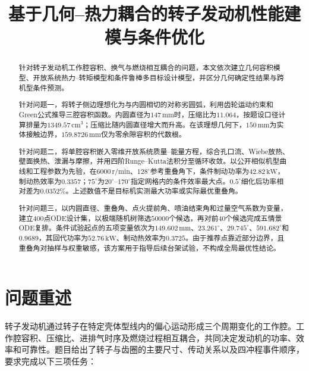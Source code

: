 \documentclass[withoutpreface,bwprint]{cumcmthesis}
\title{基于几何--热力耦合的转子发动机性能建模与条件优化}
\begin{document}
\maketitle

\begin{abstract}
针对转子发动机工作腔容积、换气与燃烧相互耦合的问题，本文依次建立几何容积模型、开放系统热力--转矩模型和条件鲁棒多目标设计模型，并区分几何确定性结果与跨机型条件预测。

针对问题一，将转子侧边理想化为与内圆相切的对称劣圆弧，利用齿轮运动约束和Green公式推导三腔容积函数。内圆直径为$147\,\mathrm{mm}$时，压缩比为$11.064$，按题设口径计算排量为$1349.57\,\mathrm{cm^3}$；压缩比随内圆直径增大而升高。在该理想几何下，$150\,\mathrm{mm}$为实体接触边界，$159.8726\,\mathrm{mm}$仅为零余隙容积的代数根。

针对问题二，将单腔容积嵌入零维开放系统质量--能量方程，综合孔口流、Wiebe放热、壁面换热、泄漏与摩擦，并用四阶Runge--Kutta法积分至循环收敛。以公开相似机型曲线和工程参数为先验，在$6000\,\mathrm{r/min}$、$128^\circ$参考重叠角下，条件制动功率为$42.82\,\mathrm{kW}$，制动热效率为$0.3357$；$75^\circ$为$20^\circ$--$170^\circ$指定网格内的条件效率最大点。$0.5^\circ$细化后功率相对差为$0.0352\%$。上述数值不是目标机实测最大功率或实际最优重叠角。

针对问题三，以内圆直径、重叠角、点火提前角、喷油结束角和过量空气系数为变量，建立$400$点ODE设计集，以极端随机树筛选$50000$个候选，再对前$40$个候选完成五情景ODE复排。条件试验起点的五项变量依次为$149.602\,\mathrm{mm}$、$23.261^\circ$、$29.745^\circ$、$591.682^\circ$和$0.9689$，其回代功率为$52.76\,\mathrm{kW}$、制动热效率为$0.3725$。由于推荐点靠近部分边界，且重叠角对抽样与权重敏感，该方案用于指导后续台架试验，不构成全局最优性结论。

\end{abstract}

\clearpage

\section{问题重述}
转子发动机通过转子在特定壳体型线内的偏心运动形成三个周期变化的工作腔。工作腔容积、压缩比、进排气时序及燃烧过程相互耦合，共同决定发动机的功率、效率和可靠性。题目给出了转子与齿圈的主要尺寸、传动关系以及四冲程事件顺序，要求完成以下三项任务：
\end{document}
